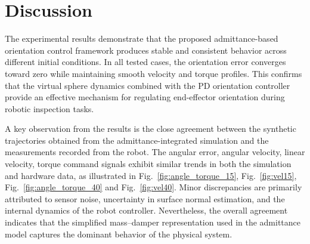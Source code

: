 \documentclass[journal]{IEEEtran}
\begin{document}

\section{Discussion}

The experimental results demonstrate that the proposed admittance-based orientation control framework produces stable and consistent behavior across different initial conditions. In all tested cases, the orientation error converges toward zero while maintaining smooth velocity and torque profiles. This confirms that the virtual sphere dynamics combined with the PD orientation controller provide an effective mechanism for regulating end-effector orientation during robotic inspection tasks.

A key observation from the results is the close agreement between the synthetic trajectories obtained from the admittance-integrated simulation and the measurements recorded from the robot. The angular error, angular velocity, linear velocity, torque command signals exhibit similar trends in both the simulation and hardware data, as illustrated in Fig.~\ref{fig:angle_torque_15}, Fig.~\ref{fig:vel15}, Fig.~\ref{fig:angle_torque_40} and Fig.~\ref{fig:vel40}. Minor discrepancies are primarily attributed to sensor noise, uncertainty in surface normal estimation, and the internal dynamics of the robot controller. Nevertheless, the overall agreement indicates that the simplified mass–damper representation used in the admittance model captures the dominant behavior of the physical system.
\end{document}
